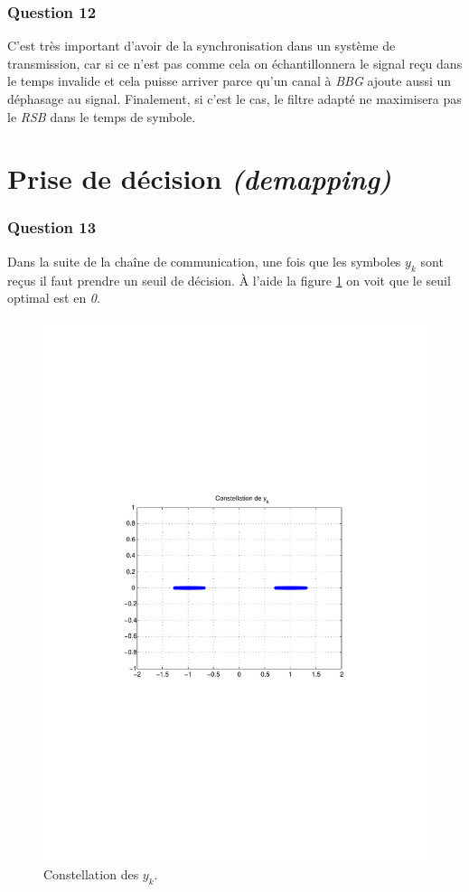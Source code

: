 \documentclass[a4paper,11pt]{article}
\begin{document}
\subsubsection*{Question 12}
C'est très important d'avoir de la synchronisation dans un système de transmission, car si ce n'est pas comme cela on échantillonnera le signal reçu dans le temps invalide et cela puisse arriver parce qu'un canal à \emph{BBG} ajoute aussi un déphasage au signal. Finalement, si c'est le cas, le filtre adapté ne maximisera pas le \emph{RSB} dans le temps de symbole.\section{Prise de décision \emph{(demapping)}}
\subsubsection*{Question 13}
Dans la suite de la chaîne de communication, une fois que les symboles $y_k$ sont reçus il faut prendre un seuil de décision. À l'aide la figure \ref{fig:q13} on voit que le seuil optimal est en \emph{0}. 
\begin{figure}
	\begin{center}
	\includegraphics[scale=0.5]{Q13.pdf}
	\caption{Constellation des $y_k$.}
	\label{fig:q13}
	\end{center}
\end{figure}  
\end{document}
